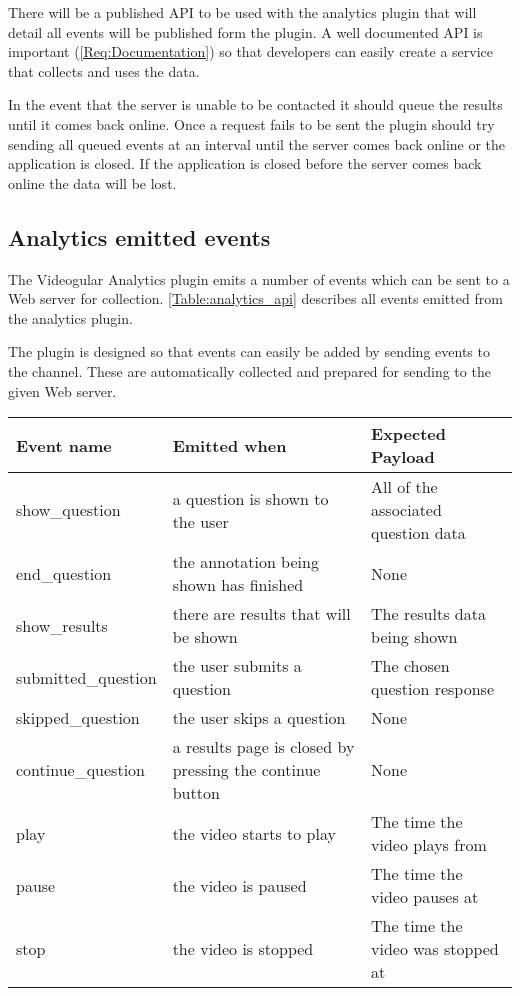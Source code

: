 There will be a published \gls{API} to be used with the analytics plugin that will detail all events will be published form the plugin. A well documented API is important (\cref{Req:Documentation}) so that developers can easily create a service that collects and uses the data.

In the event that the server is unable to be contacted it should queue the results until it comes back online. Once a request fails to be sent the plugin should try sending all queued events at an interval until the server comes back online or the application is closed. If the application is closed before the server comes back online the data will be lost.

\subsection{Analytics emitted events}

The Videogular Analytics plugin emits a number of events which can be sent to a Web server for collection. \autoref{Table:analytics_api} describes all events emitted from the analytics plugin.

The plugin is designed so that events can easily be added by sending events to the  channel. These are automatically collected and prepared for sending to the given Web server.

\begin{tabular}{p{3.2cm} p{6cm} p{4cm}}
\caption{\label{Table:analytics_api}API of the emitted analytics events and their data payload}
\textbf{Event name} & \textbf{Emitted when} & \textbf{Expected Payload} \\
\hline
show\_question & a question is shown to the user & All of the associated question data \\
\hline
end\_question & the annotation being shown has finished & None \\
\hline
show\_results & there are results that will be shown & The results data being shown \\
\hline
submitted\_question & the user submits a question & The chosen question response \\
\hline
skipped\_question & the user skips a question & None \\
\hline
continue\_question & a results page is closed by pressing the continue button & None \\
\hline
play & the video starts to play & The time the video plays from \\
\hline
pause & the video is paused & The time the video pauses at \\
\hline
stop & the video is stopped & The time the video was stopped at \\
\end{tabular}

